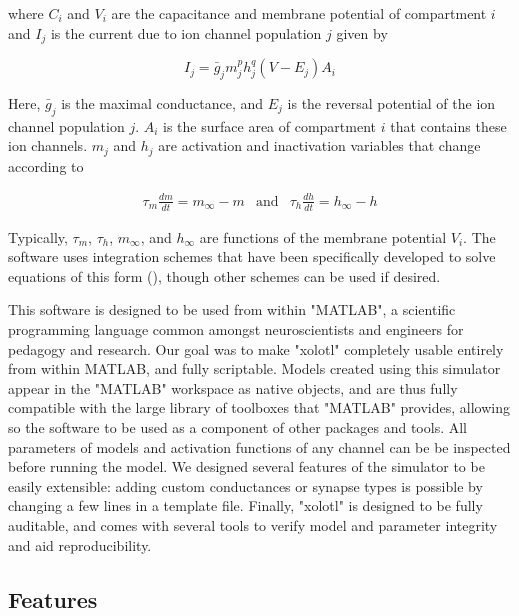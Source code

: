 \documentclass{frontiersSCNS} %
\begin{document}
where \( C_{i} \) and  \( V_{i} \) are the capacitance and membrane potential of compartment  \( i \) and \( I_{j} \) is the current due to ion channel population \( j \) given by 

\begin{equation}
I_{j}=\bar{g}_{j}m_{j}^{p}h_{j}^{q}(V-E_{j})A_{i}  \label{eq:2}
\end{equation}

Here, \( \bar{g}_{j} \) is the maximal conductance, and \( E_{j} \) is the reversal potential of the ion channel population \( j \). \( A_{i} \) is the surface area of compartment \( i\) that contains these ion channels.  \( m_{j} \) and \( h_{j} \) are activation and inactivation variables that change according to

\begin{eqnarray*}
\tau_{m}\frac{dm}{dt}=m_{\infty}-m & \mathrm{and} & \tau_{h}\frac{dh}{dt}=h_{\infty}-h
\end{eqnarray*}

Typically, \( \tau_{m} \), \( \tau_{h} \), \( m_{\infty} \), and \( h_{\infty} \) are functions of the membrane potential \( V_{i} \). The software uses integration schemes that have been specifically developed to solve equations of this form (\cite{dayanTheoreticalNeuroscience2001, hinesEfficientComputationBranched1984, ohErrorAnalysisSpecialized2006}), though other schemes can be used if desired.   

This software is designed to be used from within "MATLAB", a scientific programming language common amongst neuroscientists and engineers for pedagogy and research. Our goal was to make "xolotl" completely usable entirely from within MATLAB, and fully scriptable. Models created using this simulator appear in the "MATLAB" workspace as native objects, and are thus fully compatible with the large library of toolboxes that "MATLAB" provides, allowing so the software to be used as a component of other packages and tools. All parameters of models and activation functions of any channel can be be inspected before running the model. We designed several features of the simulator to be easily extensible: adding custom conductances or synapse types is possible by changing a few lines in a template file. Finally, "xolotl" is designed to be fully auditable, and comes with several tools to verify model and parameter integrity and aid reproducibility. 



\subsection{Features}
\label{features}
\end{document}
